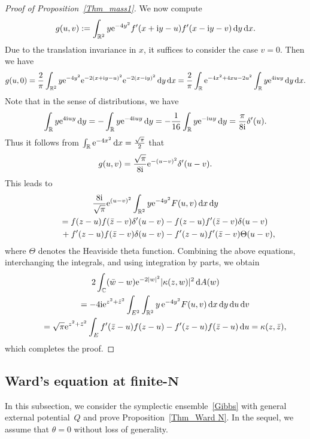 \documentclass[pdftex]{sigma}
\numberwithin{equation}{section}
\newcommand{\R}{{\mathbb R}}
\newcommand{\C}{{\mathbb C}}
\newcommand{\1}{\chi}
\begin{document}
\begin{proof}[Proof of Proposition~\ref{Thm_mass1}]
We now compute
\begin{gather*}
		g(u,v):= \int_{ \R^2 } y {\rm e}^{-4y^2} f'(x+{\rm i}y-u)f'(x-{\rm i}y-v) \,{\rm d}y \,{\rm d}x.
\end{gather*}
Due to the translation invariance in $x$, it suffices to consider the case $v=0$. Then we have
	\begin{gather*}
		g(u,0) = \frac{2}{\pi} \int_{ \R^2 } y {\rm e}^{-4y^2} {\rm e}^{-2(x+{\rm i}y-u)^2} {\rm e}^{-2(x-{\rm i}y)^2} \,{\rm d}y \,{\rm d}x
	= \frac{2}{\pi} \int_{\R} {\rm e}^{-4x^2+4xu-2u^2} \int_{\R} y {\rm e}^{4{\rm i}uy} \,{\rm d}y \,{\rm d}x.
	\end{gather*}
Note that in the sense of distributions, we have
	\begin{gather*}
			\int_{\R} y {\rm e}^{4{\rm i}uy} \,{\rm d}y= -\int_{\R} y {\rm e}^{-4{\rm i}uy} \,{\rm d}y=-\frac{1}{16} \int_{\R} y {\rm e}^{-{\rm i}u y} \,{\rm d}y=\frac{\pi }{8{\rm i}} \delta'(u).
		\end{gather*}
	Thus it follows from $\int_\R {\rm e}^{-4x^2}\,{\rm d}x=\tfrac{\sqrt{\pi}}{2}$ that
	\begin{gather*}
		g(u,v)= \frac{\sqrt{\pi}}{8{\rm i}} {\rm e}^{-(u-v)^2} \delta'(u-v).
	\end{gather*}
	This leads to
	\begin{gather*}
 \frac{8{\rm i}}{\sqrt{\pi}} {\rm e}^{(u-v)^2} \int_{ \R^2 } y {\rm e}^{-4y^2} F(u,v) \,{\rm d}x\,{\rm d}y
		\\
\qquad{} =f(z-u)f(\bar{z}-v) \delta'(u-v)-f(z-u)f'(\bar{z}-v) \delta(u-v)
		\\
\qquad\quad{} +f'(z-u) f(\bar{z}-v) \delta(u-v)-f'(z-u) f'(\bar{z}-v) \Theta(u-v),
	\end{gather*}
	where $\Theta$ denotes the Heaviside theta function. Combining the above equations, interchanging the integrals, and using integration by parts, we obtain
	\begin{gather*}
 2 \int_{ \C } (\bar{w}-w) {\rm e}^{ -2|w|^2 } |\kappa(z,w)|^2 \,{\rm d}A(w) \\
 \qquad{} =-4{\rm i} {\rm e}^{z^2+\bar{z}^2} \int_{ E^2 } \int_{ \R^2 } y \, {\rm e}^{-4y^2} F(u,v) \,{\rm d}x \,{\rm d}y \,{\rm d}u \,{\rm d}v
		\\
\qquad{}= \sqrt{\pi} {\rm e}^{z^2+\bar{z}^2} \int_{E} f'(\bar{z}-u)f(z-u)-f'(z-u) f(\bar{z}-u)\,{\rm d}u=\kappa(z,\bar{z}),
	\end{gather*}
	which completes the proof.
\end{proof}

\subsection[Ward's equation at finite-N]{Ward's equation at finite-$\boldsymbol{N}$} In this subsection, we consider the symplectic ensemble~\eqref{Gibbs} with general external potential~$Q$ and prove Proposition~\ref{Thm_Ward N}. In the sequel, we assume that $\theta=0$ without loss of generality.
\end{document}
